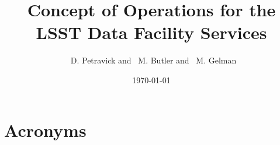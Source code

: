 \documentclass[DM,lsstdraft,toc]{lsstdoc}
\title[ConOps for LSST Data Facility Services]{Concept of Operations for the LSST Data Facility Services}
\author{
~D. Petravick and
~M. Butler and
~M. Gelman}
\date{\today}
\begin{document}
\maketitle




\section{Acronyms}

\end{document}
